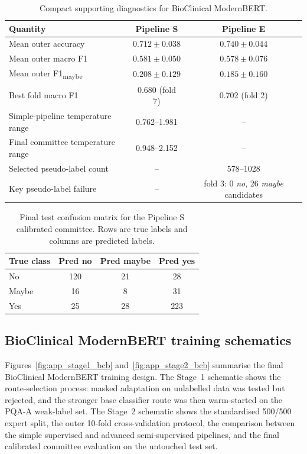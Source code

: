 \begin{table}[htbp]
\centering
\footnotesize
\setlength{\tabcolsep}{4pt}
\renewcommand{\arraystretch}{1.1}
\begin{tabularx}{\columnwidth}{|X|c|c|}
\hline
\textbf{Quantity} & \textbf{Pipeline S} & \textbf{Pipeline E} \\
\hline
Mean outer accuracy & $0.712\pm0.038$ & $0.740\pm0.044$ \\
\hline
Mean outer macro F1 & $\mathbf{0.581\pm0.050}$ & $0.578\pm0.076$ \\
\hline
Mean outer F1\textsubscript{maybe} & $\mathbf{0.208\pm0.129}$ & $0.185\pm0.160$ \\
\hline
Best fold macro F1 & 0.680 (fold 7) & 0.702 (fold 2) \\
\hline
Simple-pipeline temperature range & 0.762--1.981 & -- \\
\hline
Final committee temperature range & 0.948--2.152 & -- \\
\hline
Selected pseudo-label count & -- & 578--1028 \\
\hline
Key pseudo-label failure & -- & fold 3: 0 \textit{no}, 26 \textit{maybe} candidates \\
\hline
\end{tabularx}
\caption{Compact supporting diagnostics for BioClinical ModernBERT.}
\label{tab:bcb_result_diagnostics}
\end{table}

\begin{table}[htbp]
\centering
\footnotesize
\setlength{\tabcolsep}{6pt}
\renewcommand{\arraystretch}{1.1}
\begin{tabular}{|l|c|c|c|}
\hline
\textbf{True class} & \textbf{Pred no} & \textbf{Pred maybe} & \textbf{Pred yes} \\
\hline
No & 120 & 21 & 28 \\
\hline
Maybe & 16 & 8 & 31 \\
\hline
Yes & 25 & 28 & 223 \\
\hline
\end{tabular}
\caption{Final test confusion matrix for the Pipeline S calibrated committee. Rows are true labels and columns are predicted labels.}
\label{tab:bcb_final_confusion}
\end{table}
\FloatBarrier

\subsection{BioClinical ModernBERT training schematics}
\label{app:bcb_schematics}
Figures~\ref{fig:app_stage1_bcb} and~\ref{fig:app_stage2_bcb} summarise the final BioClinical ModernBERT training design. The Stage~1 schematic shows the route-selection process: masked adaptation on unlabelled data was tested but rejected, and the stronger base classifier route was then warm-started on the PQA-A weak-label set. The Stage~2 schematic shows the standardised 500/500 expert split, the outer 10-fold cross-validation protocol, the comparison between the simple supervised and advanced semi-supervised pipelines, and the final calibrated committee evaluation on the untouched test set.

